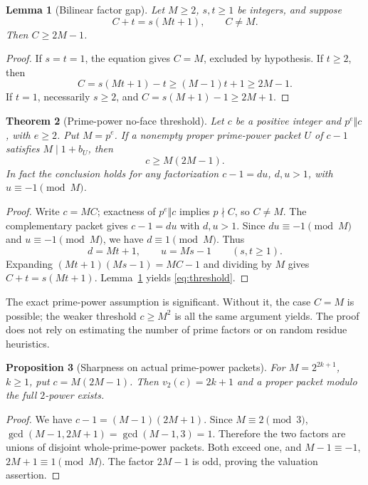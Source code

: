 \documentclass[11pt]{article}
\newtheorem{theorem}{Theorem}[section]
\newtheorem{proposition}[theorem]{Proposition}
\newtheorem{lemma}[theorem]{Lemma}
\theoremstyle{definition}\newtheorem{definition}[theorem]{Definition}
\theoremstyle{remark}\newtheorem{remark}[theorem]{Remark}
\begin{document}
\begin{lemma}[Bilinear factor gap]\label{lem:gap}
Let \(M\ge2\), \(s,t\ge1\) be integers, and suppose
\[
 C+t=s(Mt+1),\qquad C\ne M.
\]
Then \(C\ge2M-1\).
\end{lemma}
\begin{proof}
If \(s=t=1\), the equation gives \(C=M\), excluded by hypothesis.
If \(t\ge2\), then
\[
 C=s(Mt+1)-t\ge (M-1)t+1\ge2M-1.
\]
If \(t=1\), necessarily \(s\ge2\), and
\(C=s(M+1)-1\ge2M+1\).
\end{proof}

\begin{theorem}[Prime-power no-face threshold]\label{thm:noface}
Let \(c\) be a positive integer and \(p^e\Vert c\), with \(e\ge2\).
Put \(M=p^e\). If a nonempty proper prime-power packet \(U\) of \(c-1\)
satisfies \(M\mid1+b_U\), then
\begin{equation}\label{eq:threshold} c\ge M(2M-1).\end{equation}
In fact the conclusion holds for any factorization
\(c-1=du\), \(d,u>1\), with \(u\equiv-1\pmod M\).
\end{theorem}
\begin{proof}
Write \(c=MC\); exactness of \(p^e\Vert c\) implies \(p\nmid C\),
so \(C\ne M\). The complementary packet gives
\(c-1=du\) with \(d,u>1\). Since \(du\equiv-1\pmod M\) and
\(u\equiv-1\pmod M\), we have \(d\equiv1\pmod M\). Thus
\[
 d=Mt+1,\qquad u=Ms-1\qquad(s,t\ge1).
\]
Expanding \((Mt+1)(Ms-1)=MC-1\) and dividing by \(M\) gives
\(C+t=s(Mt+1)\). Lemma~\ref{lem:gap} yields \eqref{eq:threshold}.
\end{proof}

The exact prime-power assumption is significant. Without it, the case
\(C=M\) is possible; the weaker threshold \(c\ge M^2\) is all the same
argument yields. The proof does not rely on estimating the number of
prime factors or on random residue heuristics.

\begin{proposition}[Sharpness on actual prime-power packets]
For \(M=2^{2k+1}\), \(k\ge1\), put \(c=M(2M-1)\). Then
\(v_2(c)=2k+1\) and a proper packet modulo the full \(2\)-power exists.
\end{proposition}
\begin{proof}
We have \(c-1=(M-1)(2M+1)\). Since \(M\equiv2\pmod3\),
\(\gcd(M-1,2M+1)=\gcd(M-1,3)=1\). Therefore the two factors are
unions of disjoint whole-prime-power packets. Both exceed one, and
\(M-1\equiv-1\), \(2M+1\equiv1\pmod M\).
The factor \(2M-1\) is odd, proving the valuation assertion.
\end{proof}
\end{document}
